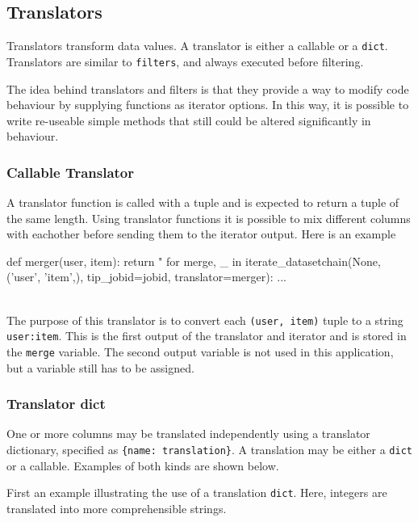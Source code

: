 \subsection{Translators}

Translators transform data values. A translator is either a callable or
a \texttt{dict}.  Translators are similar to \texttt{filters}, and
always executed before filtering.

The idea behind translators and filters is that they provide a way to
modify code behaviour by supplying functions as iterator options.  In
this way, it is possible to write re-useable simple methods that still
could be altered significantly in behaviour.



\subsubsection*{Callable Translator}

A translator function is called with a tuple and is expected to return
a tuple of the same length.  Using translator functions it is possible
to mix different columns with eachother before sending them to the
iterator output.  Here is an example

\begin{python}
def merger(user, item):
    return "%
for merge, _ in iterate_datasetchain(None, ('user', 'item',), tip_jobid=jobid,
                                     translator=merger):
    ...
\end{python}
\\
The purpose of this translator is to convert each
\texttt{(user, item)} tuple to a string \texttt{user:item}.  This is
the first output of the translator and iterator and is stored in the
\texttt{merge} variable.  The second output variable is not used in
this application, but a variable still has to be assigned.



\subsubsection*{Translator dict}

One or more columns may be translated independently using a translator
dictionary, specified as \texttt{\{name:\ translation\}}.  A
translation may be either a \texttt{dict} or a callable.  Examples of
both kinds are shown below.

First an example illustrating the use of a translation \texttt{dict}.
Here, integers are translated into more comprehensible strings.

